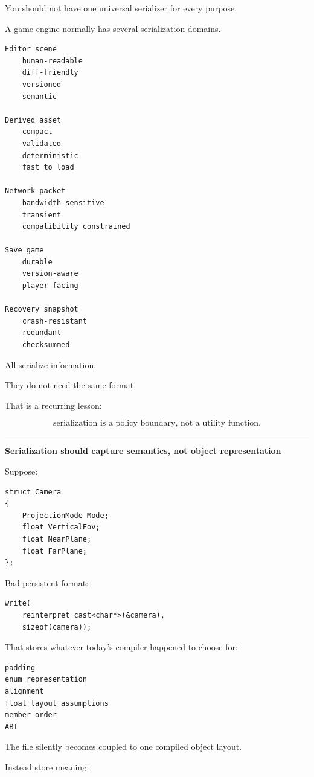 You should not have one universal serializer for every purpose.

A game engine normally has several serialization domains.

\begin{verbatim}
Editor scene
    human-readable
    diff-friendly
    versioned
    semantic

Derived asset
    compact
    validated
    deterministic
    fast to load

Network packet
    bandwidth-sensitive
    transient
    compatibility constrained

Save game
    durable
    version-aware
    player-facing

Recovery snapshot
    crash-resistant
    redundant
    checksummed
\end{verbatim}

All serialize information.

They do not need the same format.

That is a recurring lesson:

\[
\boxed{
\text{serialization is a policy boundary, not a utility function.}
}
\]

\begin{center}\rule{0.5\linewidth}{0.5pt}\end{center}

\textbf{Serialization should capture semantics, not object representation}

Suppose:

\begin{verbatim}
struct Camera
{
    ProjectionMode Mode;
    float VerticalFov;
    float NearPlane;
    float FarPlane;
};
\end{verbatim}

Bad persistent format:

\begin{verbatim}
write(
    reinterpret_cast<char*>(&camera),
    sizeof(camera));
\end{verbatim}

That stores whatever today's compiler happened to choose for:

\begin{verbatim}
padding
enum representation
alignment
float layout assumptions
member order
ABI
\end{verbatim}

The file silently becomes coupled to one compiled object layout.

Instead store meaning:

